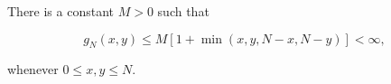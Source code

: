 There is a constant $M > 0$ such that

$$g_N(x,y) \leq M[1 + \min(x,y,N-x,N-y)] < \infty,$$

whenever $0 \leq x,y \leq N$.